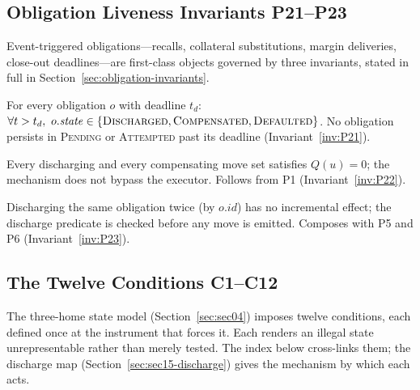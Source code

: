 \subsection{Obligation Liveness Invariants P21--P23}
\label{sec:sec15-obligation}

Event-triggered obligations\allowbreak---\allowbreak recalls, collateral substitutions, margin deliveries, close-out deadlines\allowbreak---\allowbreak are first-class objects governed by three invariants, stated in full in Section~\ref{sec:obligation-invariants}.

\begin{description}[leftmargin=3.2em,style=nextline]
\item[P21 Obligation liveness] For every obligation $o$ with deadline $t_d$: $\forall t>t_d,\ o.\mathit{state}\in\{\textsc{Discharged},\allowbreak\textsc{Compensated},\allowbreak\textsc{Defaulted}\}$. No obligation persists in \textsc{Pending} or \textsc{Attempted} past its deadline (Invariant~\ref{inv:P21}).
\item[P22 Obligation conservation] Every discharging and every compensating move set satisfies $Q(u)=0$; the mechanism does not bypass the executor. Follows from P1 (Invariant~\ref{inv:P22}).
\item[P23 Obligation idempotency] Discharging the same obligation twice (by $o.\mathit{id}$) has no incremental effect; the discharge predicate is checked before any move is emitted. Composes with P5 and P6 (Invariant~\ref{inv:P23}).
\end{description}

\subsection{The Twelve Conditions C1--C12}
\label{sec:sec15-conditions}

The three-home state model (Section~\ref{sec:sec04}) imposes twelve conditions, each defined once at the instrument that forces it. Each renders an illegal state unrepresentable rather than merely tested. The index below cross-links them; the discharge map (Section~\ref{sec:sec15-discharge}) gives the mechanism by which each acts.

